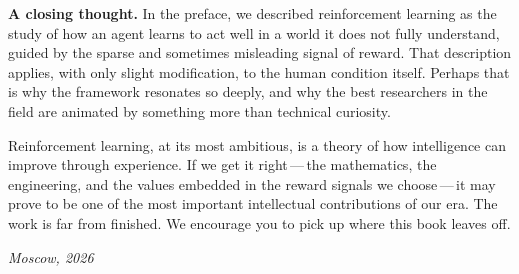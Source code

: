 \textbf{A closing thought.}\quad
In the preface, we described reinforcement learning as the study of how an agent learns to
act well in a world it does not fully understand, guided by the sparse and sometimes
misleading signal of reward.  That description applies, with only slight modification, to
the human condition itself.  Perhaps that is why the framework resonates so deeply, and why
the best researchers in the field are animated by something more than technical curiosity.

Reinforcement learning, at its most ambitious, is a theory of how intelligence can improve
through experience.  If we get it right\,---\,the mathematics, the engineering, and the
values embedded in the reward signals we choose\,---\,it may prove to be one of the most
important intellectual contributions of our era.  The work is far from finished.  We
encourage you to pick up where this book leaves off.

\bigskip

\hfill\textit{Moscow, 2026}
